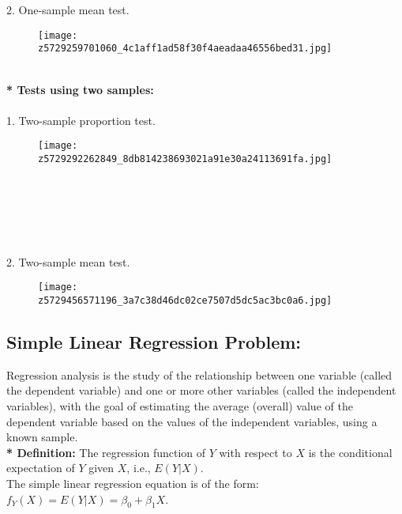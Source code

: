 \documentclass{article}
\begin{document}
	\\\\\\\\\\\\\\\\\\\\\\\\2. One-sample mean test.\\
	\begin{figure}[!ht]
		\centering
		\texttt{[image: z5729259701060\_4c1aff1ad58f30f4aeadaa46556bed31.jpg]}
		
		\label{fig:enter-label}
	\end{figure}
	\\\textbf{* Tests using two samples:}\\\\
	1. Two-sample proportion test.\\
	\begin{figure}[!ht]
		\centering
		\texttt{[image: z5729292262849\_8db814238693021a91e30a24113691fa.jpg]}
		
		\label{fig:enter-label}
	\end{figure}\\\\\\\\\\
	2. Two-sample mean test.\\
	\begin{figure}[!ht]
		\centering
		\texttt{[image: z5729456571196\_3a7c38d46dc02ce7507d5dc5ac3bc0a6.jpg]}
		
		\label{fig:enter-label}
	\end{figure}
	\subsection{Simple Linear Regression Problem:}
	Regression analysis is the study of the relationship between one variable (called the dependent variable) and one or more other variables (called the independent variables), with the goal of estimating the average (overall) value of the dependent variable based on the values of the independent variables, using a known sample.\\
	
	\textbf{* Definition:} The regression function of \( Y \) with respect to \( X \) is the conditional expectation of \( Y \) given \( X \), i.e., \( E(Y|X) \). \\
	The simple linear regression equation is of the form: \( f_Y(X) = E(Y|X) = \beta_0 + \beta_1 X \).\\
	
\end{document}
